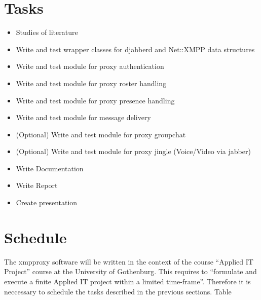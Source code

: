 \documentclass[a4paper,10pt,numbers=noendperiod]{scrartcl}
\begin{document}
\section{Tasks}
\begin{itemize}
	\item Studies of literature
	\item Write and test wrapper classes for djabberd and Net::XMPP data structures 
	\item Write and test module for proxy authentication
	\item Write and test module for proxy roster handling
	\item Write and test module for proxy presence handling 
	\item Write and test module for message delivery 
	\item (Optional) Write and test module for proxy groupchat
	\item (Optional) Write and test module for proxy jingle (Voice/Video via jabber)	
	\item Write Documentation	
	\item Write Report
	\item Create presentation
\end{itemize}


\section{Schedule}
The xmpproxy software will be written in the context of the course ``Applied IT Project'' course at the University of Gothenburg. This requires to ``formulate and execute a finite Applied IT project within a limited time-frame''. 
Therefore it is neccessary to schedule the tasks described in the previous sections. Table  
\end{document}
